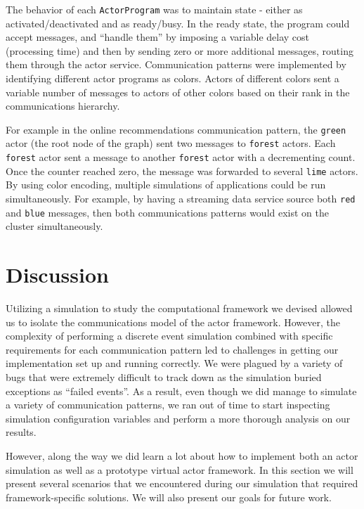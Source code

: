 \documentclass[conference,twocolumn,10pt]{IEEEtran}
\begin{document}
The behavior of each \texttt{ActorProgram} was to maintain state - either as activated/deactivated and as ready/busy. In the ready state, the program could accept messages, and ``handle them'' by imposing a variable delay cost (processing time) and then by sending zero or more additional messages, routing them through the actor service.  Communication patterns were implemented by identifying different actor programs as colors. Actors of different colors sent a variable number of messages to actors of other colors based on their rank in the communications hierarchy.

For example in the online recommendations communication pattern, the \texttt{green} actor (the root node of the graph) sent two messages to \texttt{forest} actors. Each \texttt{forest} actor sent a message to another \texttt{forest} actor with a decrementing count. Once the counter reached zero, the message was forwarded to several \texttt{lime} actors. By using color encoding, multiple simulations of applications could be run simultaneously. For example, by having a streaming data service source both \texttt{red} and \texttt{blue} messages, then both communications patterns would exist on the cluster simultaneously.

\section{Discussion}

Utilizing a simulation to study the computational framework we devised allowed us to isolate the communications model of the actor framework. However, the complexity of performing a discrete event simulation combined with specific requirements for each communication pattern led to challenges in getting our implementation set up and running correctly. We were plagued by a variety of bugs that were extremely difficult to track down as the simulation buried exceptions as ``failed events''. As a result, even though we did manage to simulate a variety of communication patterns, we ran out of time to start inspecting simulation configuration variables and perform a more thorough analysis on our results.

However, along the way we did learn a lot about how to implement both an actor simulation as well as a prototype virtual actor framework. In this section we will present several scenarios that we encountered during our simulation that required framework-specific solutions. We will also present our goals for future work.
\end{document}
